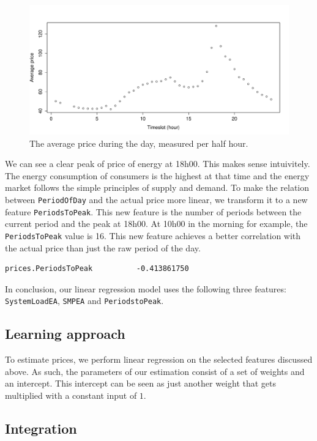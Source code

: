 \documentclass[a4,10pt]{article}
\begin{document}
\begin{figure}
	\centering
	\includegraphics[width=\textwidth]{img/timeslot_averageprice.pdf}
	\caption{The average price during the day, measured per half hour.}
	\label{fig:timeslot_average}
\end{figure}

We can see a clear peak of price of energy at 18h00. This makes sense intuivitely. The energy consumption of consumers is the highest at that time and the energy market follows the simple principles of supply and demand. To make the relation between \verb|PeriodOfDay| and the actual price more linear, we transform it to a new feature \verb|PeriodsToPeak|. This new feature is the number of periods between the current period and the peak at 18h00. At 10h00 in the morning for example, the \verb|PeriodsToPeak| value is 16. This new feature achieves a better correlation with the actual price than just the raw period of the day.
\begin{verbatim}
prices.PeriodsToPeak          -0.413861750
\end{verbatim}
In conclusion, our linear regression model uses the following three features: \verb|SystemLoadEA|, \verb|SMPEA| and \verb|PeriodstoPeak|.

\subsection{Learning approach}
To estimate prices, we perform linear regression on the selected features discussed above. As such, the parameters of our estimation consist of a set of weights and an intercept. This intercept can be seen as just another weight that gets multiplied with a constant input of $1$.

\subsection{Integration}
\end{document}
